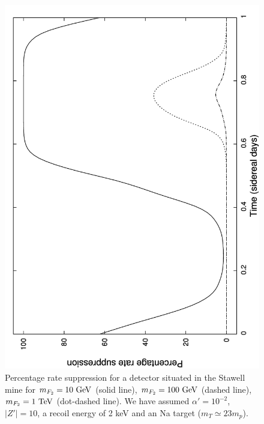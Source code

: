 \documentclass[12pt]{article}
\begin{document}

%
\begin{figure}[htpb]
    \centering
        \includegraphics[scale=0.5, angle=270]{fig3}
    \caption{Percentage rate suppression for a detector situated in the Stawell mine for $m _{F_2} = 10 \ \rm GeV$ (solid line), $m _{F_2} = 100 \ \rm GeV$ (dashed line), $m _{F_2} = 1 \ \rm TeV$ (dot-dashed line). We have assumed $\alpha ' = 10 ^{-2}$, $|Z'| = 10$, a recoil energy of 2 keV and an Na target ($m _T \simeq 23 m _p$).}
    \label{fig:stawell}
%
\end{figure}
\indent
\end{document}
